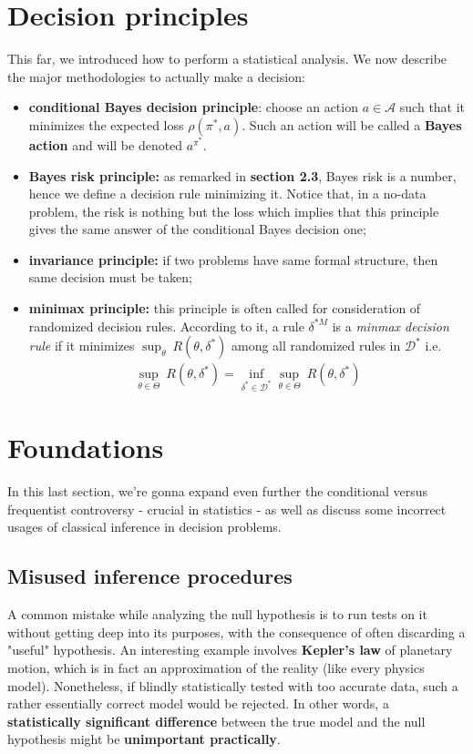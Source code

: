 \documentclass{article}
\begin{document}
	\section{Decision principles}
	This far, we introduced how to perform a statistical analysis. We now describe the major methodologies to actually make a decision: 
	
	\begin{itemize}
		\item \textbf{conditional Bayes decision principle}: choose an action $a \in \mathcal{A}$ such that it minimizes the expected loss $\rho(\pi^*, a)$. Such an action will be called a 
		\textbf{Bayes action} and will be denoted $a^{\pi^*}$. 
	     
		\item \textbf{Bayes risk principle:} as remarked in \textbf{section 2.3}, Bayes risk is a number, hence we define a decision rule minimizing it. Notice that, in a no-data problem, the risk is nothing but the loss which implies that this principle gives the same answer of the conditional Bayes decision one;
		\item \textbf{invariance principle:} if two problems have same formal structure, then same decision must be taken;
		\item\textbf{minimax principle:} this principle is often called for consideration of randomized decision rules. According to it, a rule $\delta^{*M}$ is a \textit{minmax decision rule} if it minimizes $\sup_{\theta} \ R(\theta, \delta^*)$ among all randomized rules in $\mathcal{D}^*$ i.e.
		\begin{align*}
			\sup_{\theta \in \Theta} \ R(\theta, \delta^*) = \inf_{\delta^* \in \mathcal{D}^*} \sup_{\theta \in \Theta} \ R(\theta, \delta^*)
		\end{align*}
	\end{itemize}
	
	\section{Foundations}
	In this last section, we're gonna expand even further the conditional versus frequentist controversy - crucial in statistics - as well as discuss some incorrect usages of classical inference in decision problems.
	
	\subsection{Misused inference procedures}	
	A common mistake while analyzing the null hypothesis is to run tests on it without getting deep into its purposes, with the consequence of often discarding a "useful" hypothesis. An interesting example
	involves \textbf{Kepler's law} of planetary motion, which is in fact an approximation of the reality (like every physics model). Nonetheless, if blindly statistically tested with too accurate data, such a rather essentially correct model would be rejected. In other words, a \textbf{statistically significant difference} between the true model and the null hypothesis might be \textbf{unimportant practically}.  
\end{document}

